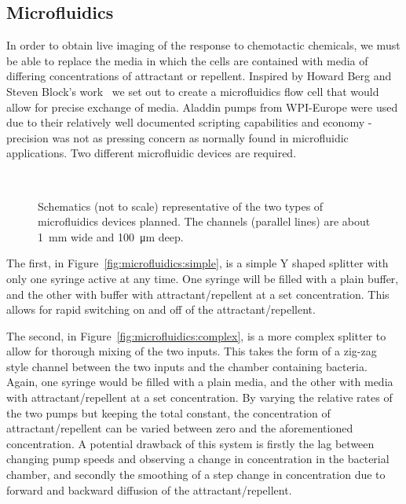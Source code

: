 \documentclass[../main.tex]{subfiles}
\begin{document}
\subsection{Microfluidics}

In order to obtain live imaging of the response to chemotactic chemicals, we must be able to replace the media in which the cells are contained with media of differing concentrations of attractant or repellent. Inspired by Howard Berg and Steven Block's work~\citep{berg84} we set out to create a microfluidics flow cell that would allow for precise exchange of media. Aladdin pumps from WPI-Europe were used due to their relatively well documented scripting capabilities and economy - precision was not as pressing concern as normally found in microfluidic applications. Two different microfluidic devices are required.

\begin{figure}[h!]
\begin{center}
\\
\caption[Microfluidics devices]{Schematics (not to scale) representative of the two types of microfluidics devices planned. The channels (parallel lines) are about \SI{1}{\milli\meter} wide and \SI{100}{\micro\meter} deep.}
\label{fig:microfluidics}
\end{center}
\end{figure}

The first, in Figure~\ref{fig:microfluidics:simple}, is a simple Y shaped splitter with only one syringe active at any time. One syringe will be filled with a plain buffer, and the other with buffer with attractant/repellent at a set concentration. This allows for rapid switching on and off of the attractant/repellent.

The second, in Figure~\ref{fig:microfluidics:complex}, is a more complex splitter to allow for thorough mixing of the two inputs. This takes the form of a zig-zag style channel between the two inputs and the chamber containing bacteria. Again, one syringe would be filled with a plain media, and the other with media with attractant/repellent at a set concentration. By varying the relative rates of the two pumps but keeping the total constant, the concentration of attractant/repellent can be varied between zero and the aforementioned concentration. A potential drawback of this system is firstly the lag between changing pump speeds and observing a change in concentration in the bacterial chamber, and secondly the smoothing of a step change in concentration due to forward and backward diffusion of the attractant/repellent.
\end{document}
